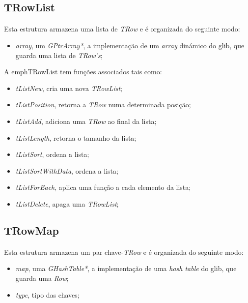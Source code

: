 \documentclass[a4paper, 10pt]{article}
\begin{document}
\subsection{TRowList}
\label{sssec:List}

\paragraph{ }

Esta estrutura armazena uma lista de \emph{TRow} e é organizada do seguinte modo:
\begin{itemize}
	\item \emph{array}, um \emph{GPtrArray*}, a implementação de um \emph{array} dinámico do glib, que guarda uma lista de \emph{TRow's};
\end{itemize}

A emph{TRowList} tem funções associados tais como:
\begin{itemize}
	\item \emph{tListNew}, cria uma nova \emph{TRowList};
	\item \emph{tListPosition}, retorna a \emph{TRow} numa determinada posição;
	\item \emph{tListAdd}, adiciona uma \emph{TRow} ao final da lista;
	\item \emph{tListLength}, retorna o tamanho da lista;
	\item \emph{tListSort}, ordena a lista;
	\item \emph{tListSortWithData}, ordena a lista;
	\item \emph{tListForEach}, aplica uma função a cada elemento da lista;
	\item \emph{tListDelete}, apaga uma \emph{TRowList};
\end{itemize}

\subsection{TRowMap}
\label{sssec:Map}

\paragraph{ }

Esta estrutura armazena um par chave-\emph{TRow} e é organizada do seguinte modo:
\begin{itemize}
	\item \emph{map}, uma \emph{GHashTable*}, a implementação de uma \emph{hash table} do glib, que guarda uma \emph{Row};
	\item \emph{type}, tipo das chaves;
\end{itemize}
\end{document}
